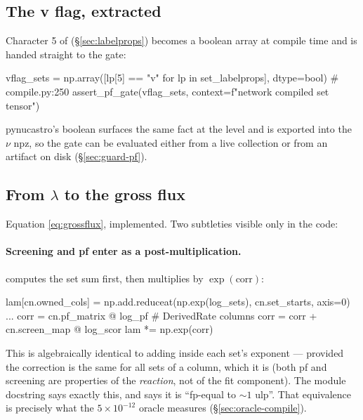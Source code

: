 \subsection{The v flag, extracted}
\label{sec:vflag-extraction}

Character 5 of  (\S\ref{sec:labelprops}) becomes a boolean
array at compile time and is handed straight to the gate:

\begin{srclisting}
vflag_sets = np.array([lp[5] == "v" for lp in set_labelprops], dtype=bool)  # compile.py:250
assert_pf_gate(vflag_sets, context=f"{network} compiled set tensor")
\end{srclisting}

pynucastro's  boolean surfaces the same fact at the
 level and is exported into the $\nu$ npz, so the gate can be
evaluated either from a live collection or from an artifact on disk
(\S\ref{sec:guard-pf}).

\subsection{From \texorpdfstring{$\lambda$}{lambda} to the gross flux}
\label{sec:lambda-to-R}

Equation \eqref{eq:grossflux}, implemented. Two subtleties visible only in the
code:

\paragraph{Screening and pf enter as a post-multiplication.}
 computes the set sum first, then multiplies by
$\exp(\text{corr})$:

\begin{srclisting}
lam[cn.owned_cols] = np.add.reduceat(np.exp(log_sets), cn.set_starts, axis=0)
...
corr = cn.pf_matrix @ log_pf          # DerivedRate columns
corr = corr + cn.screen_map @ log_scor
lam *= np.exp(corr)
\end{srclisting}

This is algebraically identical to adding inside each set's exponent --- provided
the correction is the same for all sets of a column, which it is (both pf and
screening are properties of the \emph{reaction}, not of the fit component). The
module docstring says exactly this, and says it is ``fp-equal to ${\sim}1$
ulp''. That equivalence is precisely what the $5\times10^{-12}$ oracle measures
(\S\ref{sec:oracle-compile}).

